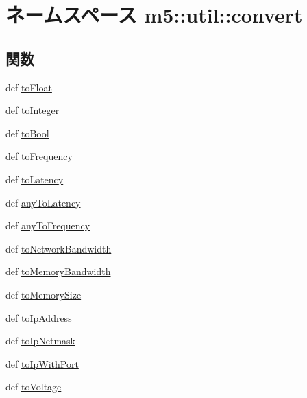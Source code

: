 \hypertarget{namespacem5_1_1util_1_1convert}{
\section{ネームスペース m5::util::convert}
\label{namespacem5_1_1util_1_1convert}
}
\subsection*{関数}
\begin{DoxyCompactItemize}
\item 
def \hyperlink{namespacem5_1_1util_1_1convert_a2ab36011290a0ed8c1c062bf62531d96}{toFloat}
\item 
def \hyperlink{namespacem5_1_1util_1_1convert_a41d38f5900a5af17ea035e2fbedbf92b}{toInteger}
\item 
def \hyperlink{namespacem5_1_1util_1_1convert_ac13ee9959561c3fd95f4859da29ca3eb}{toBool}
\item 
def \hyperlink{namespacem5_1_1util_1_1convert_ac776d14f4466b6a5290902462b775c87}{toFrequency}
\item 
def \hyperlink{namespacem5_1_1util_1_1convert_a6ee19bcc8de87fbc62dd420560fc9bcf}{toLatency}
\item 
def \hyperlink{namespacem5_1_1util_1_1convert_ad311c20fe1562644cda013c3984dc66f}{anyToLatency}
\item 
def \hyperlink{namespacem5_1_1util_1_1convert_ad6ddb873408a6cb4ba9cb4f93b608d4d}{anyToFrequency}
\item 
def \hyperlink{namespacem5_1_1util_1_1convert_a2bc4a1bd1507f58d8e84b682539726f8}{toNetworkBandwidth}
\item 
def \hyperlink{namespacem5_1_1util_1_1convert_aa1a03d449e982c6bcfa243ac67b294af}{toMemoryBandwidth}
\item 
def \hyperlink{namespacem5_1_1util_1_1convert_a7ab42fd0e97802bfce49d88ca103cc0d}{toMemorySize}
\item 
def \hyperlink{namespacem5_1_1util_1_1convert_a7df5b5cc19f06be346117884f072e337}{toIpAddress}
\item 
def \hyperlink{namespacem5_1_1util_1_1convert_a6c19240ce689c6e907cf9129d0e45460}{toIpNetmask}
\item 
def \hyperlink{namespacem5_1_1util_1_1convert_ad5b8b103fe72c095a622747b198e4615}{toIpWithPort}
\item 
def \hyperlink{namespacem5_1_1util_1_1convert_a6b1f5cf7f135f56616327e035c5583e0}{toVoltage}
\end{DoxyCompactItemize}
